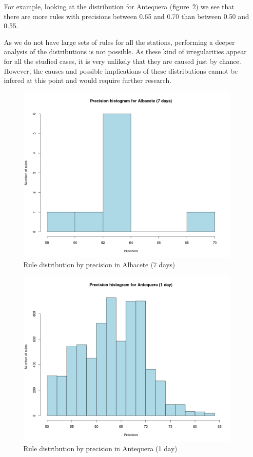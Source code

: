 For example, looking at the distribution for Antequera (figure~\ref{fig:hist_ant1}) we see that there are more rules with precisions between 0.65 and 0.70 than between 0.50 and 0.55.

As we do not have large sets of rules for all the stations, performing a deeper analysis of the distributions is not possible. As these kind of irregularities appear for all the studied cases, it is very unlikely that they are caused just by chance. However, the causes and possible implications of these distributions cannot be infered at this point and would require further research.

\begin{figure}[hbtp]
\includegraphics[width=\textwidth]{img/hist_alb7.png}
\caption{Rule distribution by precision in Albacete (7 days)} \label{fig:hist_alb7}
\end{figure}

\begin{figure}[hbtp]
\includegraphics[width=\textwidth]{img/hist_ant1.png}
\caption{Rule distribution by precision in Antequera (1 day)} \label{fig:hist_ant1}
\end{figure}

